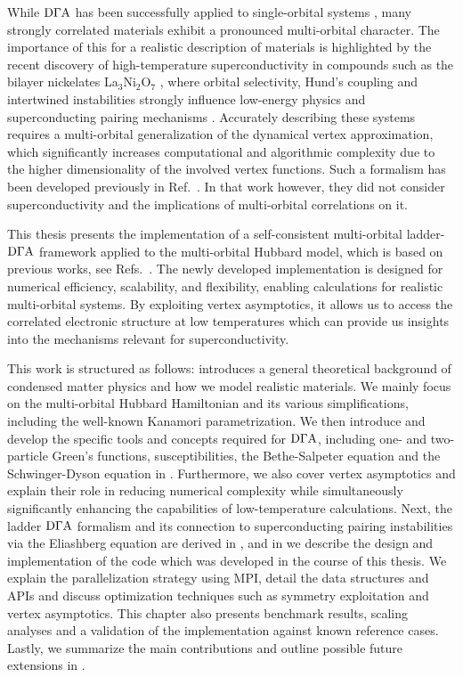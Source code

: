 \documentclass[../../main.tex]{subfiles}
\begin{document}
While $\text{D}\Gamma\text{A}$ has been successfully applied to single-orbital systems \cite{Worm2024, DiCataldo2024}, many strongly correlated materials exhibit a pronounced multi-orbital character. The importance of this for a realistic description of materials is highlighted by the recent discovery of high-temperature superconductivity in compounds such as the bilayer nickelates La$_3$Ni$_2$O$_7$ \cite{Sun2023}, where orbital selectivity, Hund’s coupling and intertwined instabilities strongly influence low-energy physics and superconducting pairing mechanisms \cite{DeMedici2011}. Accurately describing these systems requires a multi-orbital generalization of the dynamical vertex approximation, which significantly increases computational and algorithmic complexity due to the higher dimensionality of the involved vertex functions. Such a formalism has been developed previously in Ref.~\cite{Galler2017}. In that work however, they did not consider superconductivity and the implications of multi-orbital correlations on it.
\newline

This thesis presents the implementation of a self-consistent multi-orbital ladder-$\text{D}\Gamma\text{A}$ framework applied to the multi-orbital Hubbard model, which is based on previous works, see Refs.~\cite{Galler2017, Galler2019, Worm2023}. The newly developed implementation is designed for numerical efficiency, scalability, and flexibility, enabling calculations for realistic multi-orbital systems. By exploiting vertex asymptotics, it allows us to access the correlated electronic structure at low temperatures which can provide us insights into the mechanisms relevant for superconductivity.
\newline

This work is structured as follows:  introduces a general theoretical background of condensed matter physics and how we model realistic materials. We mainly focus on the multi-orbital Hubbard Hamiltonian and its various simplifications, including the well-known Kanamori parametrization. We then introduce and develop the specific tools and concepts required for $\text{D}\Gamma\text{A}$, including one- and two-particle Green's functions, susceptibilities, the Bethe-Salpeter equation and the Schwinger-Dyson equation in . Furthermore, we also cover vertex asymptotics and explain their role in reducing numerical complexity while simultaneously significantly enhancing the capabilities of low-temperature calculations. Next, the ladder $\text{D}\Gamma\text{A}$ formalism and its connection to superconducting pairing instabilities via the Eliashberg equation are derived in , and in  we describe the design and implementation of the code which was developed in the course of this thesis. We explain the parallelization strategy using MPI, detail the data structures and APIs and discuss optimization techniques such as symmetry exploitation and vertex asymptotics. This chapter also presents benchmark results, scaling analyses and a validation of the implementation against known reference cases. Lastly, we summarize the main contributions and outline possible future extensions in .
\end{document}
